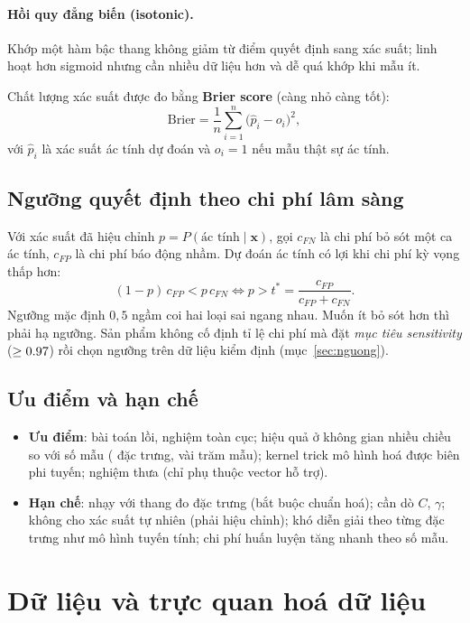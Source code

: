\documentclass[12pt]{article}
\begin{document}
\paragraph{Hồi quy đẳng biến (isotonic).} Khớp một hàm bậc thang không giảm từ điểm quyết định sang xác suất; linh
hoạt hơn sigmoid nhưng cần nhiều dữ liệu hơn và dễ quá khớp khi mẫu ít.

Chất lượng xác suất được đo bằng \textbf{Brier score} (càng nhỏ càng tốt):
\[
  \text{Brier} = \frac{1}{n}\sum_{i=1}^{n} \big(\hat{p}_i - o_i\big)^2 ,
\]
với $\hat{p}_i$ là xác suất ác tính dự đoán và $o_i = 1$ nếu mẫu thật sự ác tính.

\subsection{Ngưỡng quyết định theo chi phí lâm sàng}
Với xác suất đã hiệu chỉnh $p = P(\text{ác tính} \mid \mathbf{x})$, gọi $c_{FN}$ là chi phí bỏ sót một ca ác tính,
$c_{FP}$ là chi phí báo động nhầm. Dự đoán ác tính có lợi khi chi phí kỳ vọng thấp hơn:
\[
  (1 - p)\, c_{FP} < p\, c_{FN}
  \iff p > t^{*} = \frac{c_{FP}}{c_{FP} + c_{FN}} .
\]
Ngưỡng mặc định $0{,}5$ ngầm coi hai loại sai ngang nhau. Muốn ít bỏ sót hơn thì phải hạ ngưỡng. Sản phẩm không
cố định tỉ lệ chi phí mà đặt \emph{mục tiêu sensitivity} ($\geq 0.97$) rồi chọn ngưỡng trên dữ liệu kiểm
định (mục~\ref{sec:nguong}).

\subsection{Ưu điểm và hạn chế}
\begin{itemize}
  \item \textbf{Ưu điểm}: bài toán lồi, nghiệm toàn cục; hiệu quả ở không gian nhiều chiều so với số mẫu
        (\NFeatures{} đặc trưng, vài trăm mẫu); kernel trick mô hình hoá được biên phi tuyến; nghiệm thưa (chỉ
        phụ thuộc vector hỗ trợ).
  \item \textbf{Hạn chế}: nhạy với thang đo đặc trưng (bắt buộc chuẩn hoá); cần dò $C$, $\gamma$; không cho xác suất
        tự nhiên (phải hiệu chỉnh); khó diễn giải theo từng đặc trưng như mô hình tuyến tính; chi phí huấn luyện
        tăng nhanh theo số mẫu.
\end{itemize}

\section{Dữ liệu và trực quan hoá dữ liệu}
\end{document}
